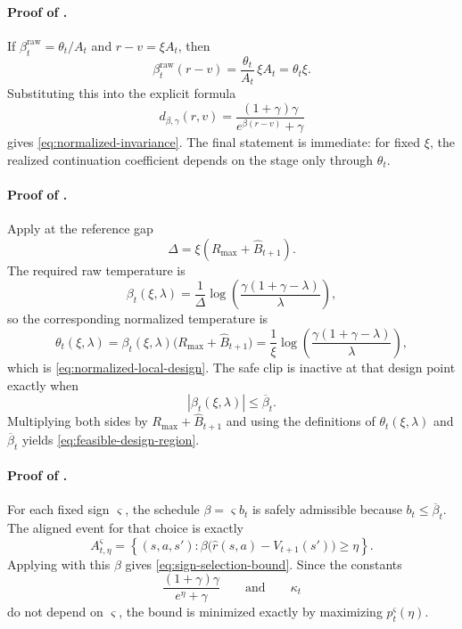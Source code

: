 \documentclass{article}
\theoremstyle{remark}
\newcommand{\betacap}{\overline\beta}
\newcommand{\Bhat}{\widehat B}
\begin{document}
\paragraph{Proof of .}
If $\beta_t^{\mathrm{raw}}=\theta_t/A_t$ and $r-v=\xi A_t$, then
\[
\beta_t^{\mathrm{raw}}(r-v)=\frac{\theta_t}{A_t}\,\xi A_t=\theta_t\xi.
\]
Substituting this into the explicit formula
\[
d_{\beta,\gamma}(r,v)=\frac{(1+\gamma)\gamma}{e^{\beta(r-v)}+\gamma}
\]
gives \eqref{eq:normalized-invariance}. The final statement is immediate: for fixed $\xi$, the realized continuation coefficient depends on the stage only through $\theta_t$.

\paragraph{Proof of .}
Apply  at the reference gap
\[
\Delta=\xi(R_{\max}+\Bhat_{t+1}).
\]
The required raw temperature is
\[
\beta_t(\xi,\lambda)=\frac{1}{\Delta}\log\!\left(\frac{\gamma(1+\gamma-\lambda)}{\lambda}\right),
\]
so the corresponding normalized temperature is
\[
\theta_t(\xi,\lambda)=\beta_t(\xi,\lambda)\bigl(R_{\max}+\Bhat_{t+1}\bigr)=\frac{1}{\xi}\log\!\left(\frac{\gamma(1+\gamma-\lambda)}{\lambda}\right),
\]
which is \eqref{eq:normalized-local-design}. The safe clip is inactive at that design point exactly when
\[
|\beta_t(\xi,\lambda)|\le \betacap_t.
\]
Multiplying both sides by $R_{\max}+\Bhat_{t+1}$ and using the definitions of $\theta_t(\xi,\lambda)$ and $\betacap_t$ yields \eqref{eq:feasible-design-region}.

\paragraph{Proof of .}
For each fixed sign $\varsigma$, the schedule $\beta=\varsigma b_t$ is safely admissible because $b_t\le \betacap_t$.
The aligned event for that choice is exactly
\[
A_{t,\eta}^{\varsigma}
=
\left\{(s,a,s'): \beta\bigl(\hat r(s,a)-V_{t+1}(s')\bigr)\ge \eta\right\}.
\]
Applying  with this $\beta$ gives \eqref{eq:sign-selection-bound}. Since the constants
\[
\frac{(1+\gamma)\gamma}{e^{\eta}+\gamma}
\qquad \text{and} \qquad
\kappa_t
\]
do not depend on $\varsigma$, the bound is minimized exactly by maximizing $p_t^{\varsigma}(\eta)$.
\end{document}
